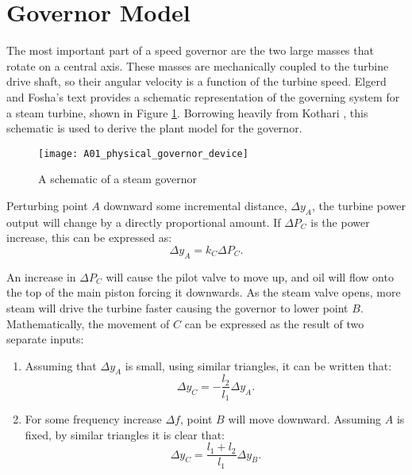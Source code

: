 \section{Governor Model}\label{app:governor_model}
The most important part of a speed governor are the two large masses that rotate on a central axis. These masses are mechanically coupled to the turbine drive shaft, so their angular velocity is a function of the turbine speed. Elgerd and Fosha's text \cite{Elgerd1970} provides a schematic representation of the governing system for a steam turbine, shown in Figure \ref{fig:A01_physical_governor_device}. Borrowing heavily from Kothari \cite{Kothari2011}, this schematic is used to derive the plant model for the governor. 

\begin{figure}[h]
	\centering
	\texttt{[image: A01\_physical\_governor\_device]}
	\caption[Steam governor schematic]{A schematic of a steam governor}
	\label{fig:A01_physical_governor_device}
\end{figure}

Perturbing point $A$ downward some incremental distance, $\Delta y_A$, the turbine power output will change by a directly proportional amount. If $\Delta P_C$ is the power increase, this can be expressed as:
\begin{equation}
	\Delta y_A = k_C \Delta P_C. \label{eq:A01}
\end{equation}

An increase in $\Delta P_C$ will cause the pilot valve to move up, and oil will flow onto the top of the main piston forcing it downwards. As the steam valve opens, more steam will drive the turbine faster causing the governor to lower point $B$. Mathematically, the movement of $C$ can be expressed as the result of two separate inputs:
\begin{enumerate}
	\item Assuming that $\Delta y_A$ is small, using similar triangles, it can be written that:
	\begin{equation}
    	\Delta y_C = - \frac{l_2}{l_1} \Delta y_A.
	\end{equation}
	\item For some frequency increase $\Delta f$, point $B$ will move downward. Assuming $A$ is fixed, by similar triangles it is clear that:
	\begin{equation}
		\Delta y_C = \frac{l_1 + l_2}{l_1} \Delta y_B.
	\end{equation}
\end{enumerate}

